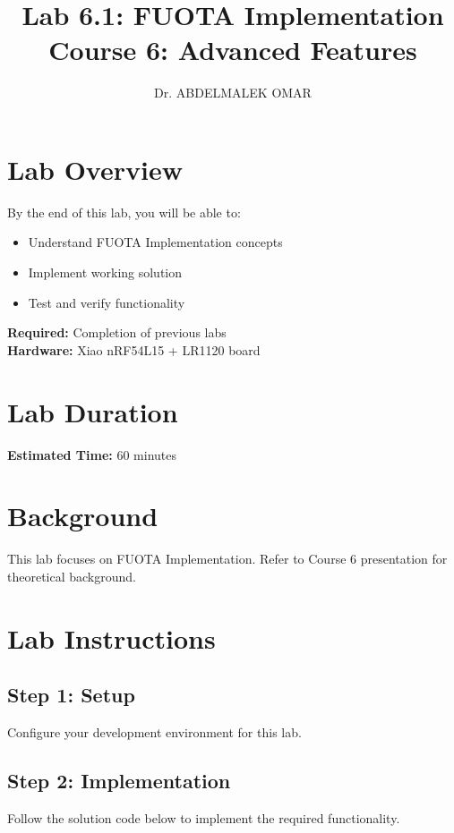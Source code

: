 \documentclass[11pt,a4paper]{article}
\title{\textbf{Lab 6.1: FUOTA Implementation}\\
\large Course 6: Advanced Features}
\author{Dr. ABDELMALEK OMAR}
\date{}
\begin{document}
\maketitle
\thispagestyle{fancy}

\section{Lab Overview}

\begin{objectivebox}
By the end of this lab, you will be able to:
\begin{itemize}
    \item Understand FUOTA Implementation concepts
    \item Implement working solution
    \item Test and verify functionality
\end{itemize}
\end{objectivebox}

\begin{prereqbox}
\textbf{Required:} Completion of previous labs\\
\textbf{Hardware:} Xiao nRF54L15 + LR1120 board
\end{prereqbox}

\section{Lab Duration}
\textbf{Estimated Time:} 60 minutes

\section{Background}

This lab focuses on FUOTA Implementation. Refer to Course 6 presentation for theoretical background.

\section{Lab Instructions}

\subsection{Step 1: Setup}
Configure your development environment for this lab.

\subsection{Step 2: Implementation}
Follow the solution code below to implement the required functionality.
\end{document}
